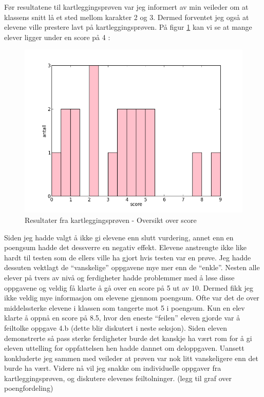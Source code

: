 \documentclass[main.tex]{subfiles}
\begin{document}
Før resultatene til kartleggingsprøven var jeg informert av min veileder om at klassens snitt lå et sted mellom
karakter 2 og 3. Dermed forventet jeg også at elevene ville prestere lavt på kartleggingsprøven. På figur 
\ref{fig:scoreoversikt} kan vi se at mange elever ligger under en score på 4 :
\begin{figure}[h!]
\centering
\includegraphics[scale = 0.5]{../figures/scoreoversikt.png}
\caption{Resultater fra kartleggingsprøven - Oversikt over score}
\label{fig:scoreoversikt}
\end{figure}

Siden jeg hadde valgt å ikke gi elevene enn slutt vurdering, annet enn en poengsum hadde det dessverre en negativ 
effekt. Elevene anstrengte ikke like hardt til testen som de ellers ville ha gjort hvis testen var en prøve.
 Jeg hadde dessuten vektlagt de ``vanskelige'' oppgavene mye mer enn de 
``enkle''. Nesten alle elever på tvers av nivå og ferdigheter hadde 
problemmer med å løse disse oppgavene og veldig få klarte å gå over en score på 5 ut av 10. Dermed fikk jeg ikke 
veldig mye informasjon om elevene gjennom poengsum. Ofte var det de over middelssterke elevene i klassen som tangerte
mot 5 i poengsum. Kun en elev klarte å oppnå en score på 8.5, hvor den eneste ``feilen'' eleven gjorde var å
feiltolke oppgave 4.b (dette blir diskutert i neste seksjon). Siden eleven demonstrerte så pass sterke ferdigheter 
burde det kanskje ha vært rom for å gi eleven uttelling for oppfattelsen hen hadde dannet om deloppgaven. 
Uansett konkluderte jeg sammen med veileder at prøven var nok litt vanskeligere enn det burde ha vært. Videre nå vil 
jeg snakke om individuelle oppgaver fra kartleggingsprøven, og diskutere elevenes feiltolninger.
(legg til graf over poengfordeling)
\end{document}
